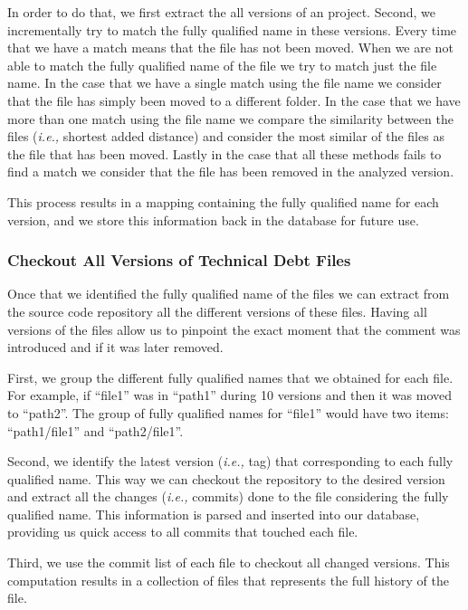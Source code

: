 In order to do that, we first extract the all versions of an project. Second, we incrementally try to match the fully qualified name in these versions. Every time that we have a match means that the file has not been moved. When we are not able to match the fully qualified name of the file we try to match just the file name. In the case that we have a single match using the file name we consider that the file has simply been moved to a different folder. In the case that we have more than one match using the file name we compare the similarity between the files (\textit{i.e.,} shortest added distance) and consider the most similar of the files as the file that has been moved. Lastly in the case that all these methods fails to find a match we consider that the file has been removed in the analyzed version.  

This process results in a mapping containing the fully qualified name for each version, and we store this information back in the database for future use.

\subsubsection*{Checkout All Versions of Technical Debt Files}
\label{subsub:checkout_all_versions_of_technical_debt_files}

Once that we identified the fully qualified name of the \SATD files we can extract from the source code repository all the different versions of these files. Having all versions of the \SATD files allow us to pinpoint the exact moment that the \SATD comment was introduced and if it was later removed.

First, we group the different fully qualified names that we obtained for each file. For example, if ``file1'' was in ``path1'' during 10 versions and then it was moved to ``path2''. The group of fully qualified names for ``file1'' would have two items: ``path1/file1'' and ``path2/file1''. 

Second, we identify the latest version (\textit{i.e.,} tag) that corresponding to each fully qualified name. This way we can checkout the repository to the desired version and extract all the changes (\textit{i.e.,} commits) done to the file considering the fully qualified name. This information is parsed and inserted into our database, providing us quick access to all commits that touched each \SATD file. 

Third, we use the commit list of each \SATD file to checkout all changed versions. This computation results in a collection of files that represents the full history of the \SATD file.  

